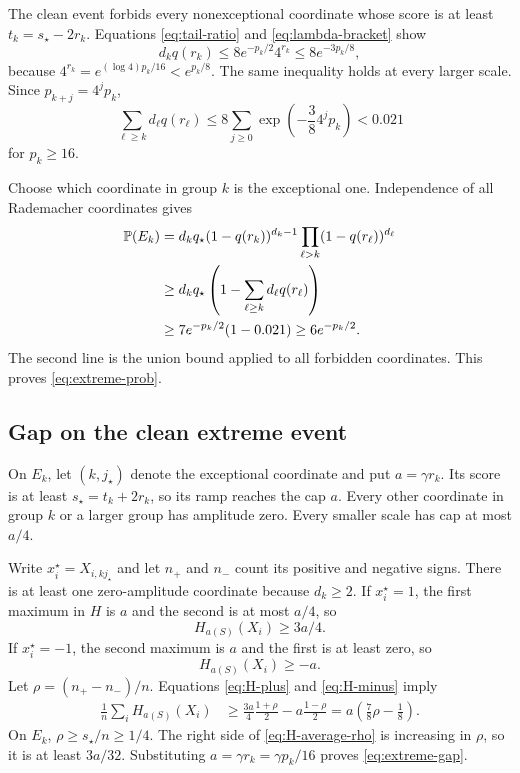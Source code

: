 The clean event forbids every nonexceptional coordinate whose score is at least
$t_k=s_\star-2r_k$. Equations \eqref{eq:tail-ratio} and \eqref{eq:lambda-bracket} show
\begin{equation}
 d_k q(r_k)
 \le8e^{-p_k/2}4^{r_k}
 \le8e^{-3p_k/8},
 \label{eq:active-expectation}
\end{equation}
because $4^{r_k}=e^{(\log4)p_k/16}<e^{p_k/8}$. The same inequality holds at every larger scale.
Since $p_{k+j}=4^jp_k$,
\begin{equation}
 \sum_{\ell\ge k}d_\ell q(r_\ell)
 \le8\sum_{j\ge0}\exp\!\left(-\frac38 4^jp_k\right)
 <0.021
 \label{eq:forbidden-sum}
\end{equation}
for $p_k\ge16$.

Choose which coordinate in group $k$ is the exceptional one. Independence of all Rademacher
coordinates gives
\begin{align}
 \mathbb P(E_k)
 &=d_kq_\star
   (1-q(r_k))^{d_k-1}
   \prod_{\ell>k}(1-q(r_\ell))^{d_\ell}\\
 &\ge d_kq_\star
 \left(1-\sum_{\ell\ge k}d_\ell q(r_\ell)\right)\\
 &\ge7e^{-p_k/2}(1-0.021)
 \ge6e^{-p_k/2}.
 \label{eq:Ek-proof}
\end{align}
The second line is the union bound applied to all forbidden coordinates. This proves
\eqref{eq:extreme-prob}.

\subsection{Gap on the clean extreme event}\label{app:gap}

On $E_k$, let $(k,j_\star)$ denote the exceptional coordinate and put $a=\gamma r_k$. Its score
is at least $s_\star=t_k+2r_k$, so its ramp reaches the cap $a$. Every other coordinate in group
$k$ or a larger group has amplitude zero. Every smaller scale has cap at most $a/4$.

Write $x_i^\star=X_{i,kj_\star}$ and let $n_+$ and $n_-$ count its positive and negative signs.
There is at least one zero-amplitude coordinate because $d_k\ge2$. If $x_i^\star=1$, the first
maximum in $H$ is $a$ and the second is at most $a/4$, so
\begin{equation}
 H_{a(S)}(X_i)\ge3a/4.
 \label{eq:H-plus}
\end{equation}
If $x_i^\star=-1$, the second maximum is $a$ and the first is at least zero, so
\begin{equation}
 H_{a(S)}(X_i)\ge-a.
 \label{eq:H-minus}
\end{equation}
Let $\rho=(n_+-n_-)/n$. Equations \eqref{eq:H-plus} and \eqref{eq:H-minus} imply
\begin{align}
 \frac1n\sum_iH_{a(S)}(X_i)
 &\ge \frac{3a}{4}\frac{1+\rho}{2}-a\frac{1-\rho}{2}
 =a\left(\frac78\rho-\frac18\right).
 \label{eq:H-average-rho}
\end{align}
On $E_k$, $\rho\ge s_\star/n\ge1/4$. The right side of \eqref{eq:H-average-rho} is increasing in
$\rho$, so it is at least $3a/32$. Substituting $a=\gamma r_k=\gamma p_k/16$ proves
\eqref{eq:extreme-gap}.

